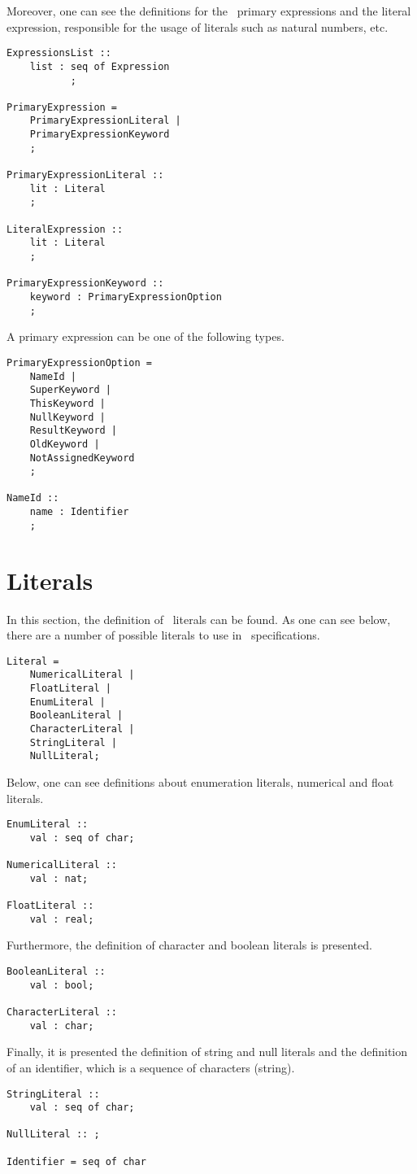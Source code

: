 \medskip
Moreover, one can see the definitions for the \jml\ primary expressions and the literal expression, responsible for the usage of literals such as natural numbers, etc.
\medskip
\begin{lstlisting}
ExpressionsList ::
    list : seq of Expression
	       ;

PrimaryExpression =
    PrimaryExpressionLiteral |
	PrimaryExpressionKeyword
	;

PrimaryExpressionLiteral ::
    lit : Literal
	;
	
LiteralExpression ::
	lit : Literal
	;
	
PrimaryExpressionKeyword ::
    keyword : PrimaryExpressionOption
	;
\end{lstlisting}
\medskip
A primary expression can be one of the following types.
\medskip
\begin{lstlisting}
PrimaryExpressionOption = 
	NameId |
	SuperKeyword |
	ThisKeyword | 
	NullKeyword |
	ResultKeyword |
	OldKeyword |
	NotAssignedKeyword
	;

NameId ::
    name : Identifier
	;
\end{lstlisting}
\medskip

\section{Literals}

In this section, the definition of \jml\ literals can be found. As one can see below, there are a number of possible literals to use in \jml\ specifications. 

\medskip
\begin{lstlisting}
Literal =
	NumericalLiteral |
	FloatLiteral |
	EnumLiteral |
	BooleanLiteral |
	CharacterLiteral |
	StringLiteral |
	NullLiteral;
\end{lstlisting}	
\medskip
Below, one can see definitions about enumeration literals, numerical and float literals.
\medskip
\begin{lstlisting}
EnumLiteral	::
	val : seq of char;
	
NumericalLiteral ::
	val : nat;
	
FloatLiteral ::
	val : real;
\end{lstlisting}
\medskip
Furthermore, the definition of character and boolean literals is presented.
\medskip
\begin{lstlisting}
BooleanLiteral ::
	val : bool;
	
CharacterLiteral ::
	val : char;
\end{lstlisting}	
\medskip
Finally, it is presented the definition of string and null literals and the definition of an identifier, which is a sequence of characters (string).
\medskip
\begin{lstlisting}
StringLiteral ::
	val : seq of char;
	
NullLiteral :: ;

Identifier = seq of char
\end{lstlisting}




